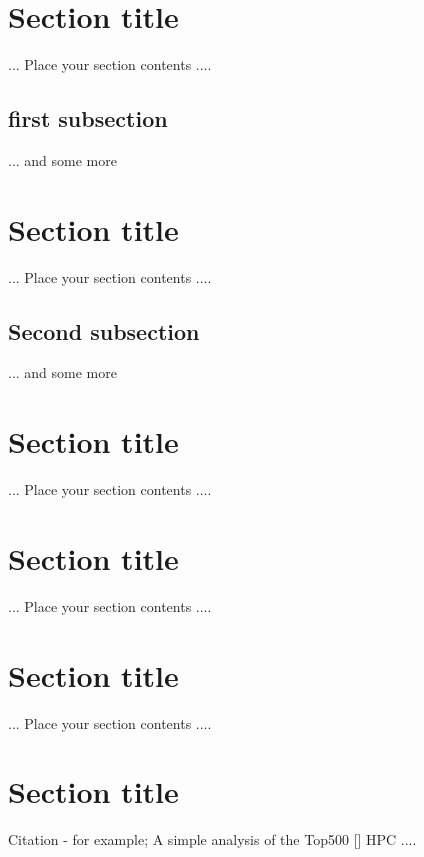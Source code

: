 {}
\ifpdf
    \graphicspath{{Chapter2/Chapter2Figs/PNG/}{Chapter2/Chapter2Figs/PDF/}{Chapter2/Chapter2Figs/}}
\else
    \graphicspath{{Chapter2/Chapter2Figs/EPS/}{Chapter2/Chapter2Figs/}}
\fi
\doublespacing
\section{Section title}
\label{sec:3.1}
... Place your section contents ....
\subsection{first subsection}
... and some more 

\section{Section title}
\label{sec:3.2}
... Place your section contents ....
\subsection{Second subsection }
... and some more 

\section{Section title}
\label{sec:3.3}
... Place your section contents ....

\section{Section title}
\label{sec:3.4}
... Place your section contents ....

\section{Section title}
\label{sec:3.5}
... Place your section contents ....

\section{Section title}
\par Citation - for example; A simple analysis of the Top500 [] HPC ....


